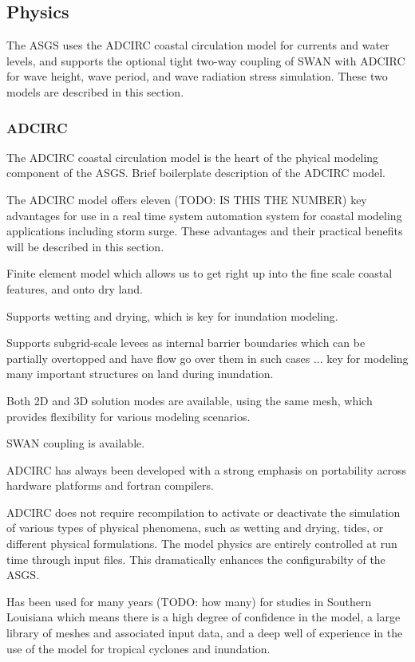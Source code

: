 \documentclass[12pt]{article}
\begin{document}
\subsection{Physics}

The ASGS uses the ADCIRC coastal circulation model for currents and water
levels, and supports the optional tight two-way coupling of SWAN with ADCIRC 
for wave height, wave period, and wave radiation stress simulation. These
two models are described in this section. 

\subsubsection{ADCIRC}

The ADCIRC coastal circulation model is the heart of the phyical 
modeling component of the ASGS. Brief boilerplate description of the 
ADCIRC model. 

The ADCIRC model offers eleven (TODO: IS THIS THE NUMBER) key 
advantages for use in a real time system automation system for 
coastal modeling applications including storm surge. These 
advantages and their practical benefits will be described in this 
section. 

Finite element model which allows us to get right up into the fine 
scale coastal features, and onto dry land. 

Supports wetting and drying, which is key for inundation modeling.

Supports subgrid-scale levees as internal barrier boundaries which 
can be partially overtopped and have flow go over them in such cases 
... key for modeling many important structures on land during 
inundation. 

Both 2D and 3D solution modes are available, using the same mesh, 
which provides flexibility for various modeling scenarios. 

SWAN coupling is available. 


ADCIRC has always been developed with a strong emphasis on 
portability across hardware platforms and fortran compilers.

ADCIRC does not require recompilation to activate or deactivate the 
simulation of various types of physical phenomena, such as wetting 
and drying, tides, or different physical formulations. The model 
physics are entirely controlled at run time through input files. 
This dramatically enhances the configurabilty of the ASGS. 

Has been used for many years (TODO: how many) for studies in 
Southern Louisiana which means there is a high degree of confidence 
in the model, a large library of meshes and associated input data, 
and a deep well of experience in the use of the model for tropical 
cyclones and inundation. 
\end{document}
